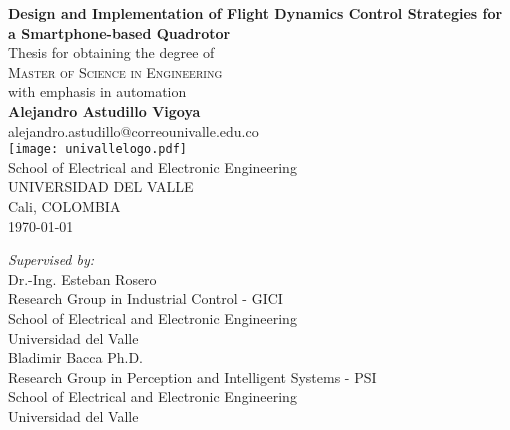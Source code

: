 \begin{titlepage}
\begin{center}
 {\LARGE\bfseries Design and Implementation of Flight Dynamics Control Strategies for a Smartphone-based Quadrotor\\}
 \vspace{2.5cm}
{Thesis for obtaining the degree of} \\[2cm]
\textsc{\Large{{Master of Science in Engineering}}} \\[5pt]
{with emphasis in automation} \\[2pt]
 \vfill
 \vspace{0.5cm}
 \vspace{1.5cm}
 {\Large\bfseries Alejandro Astudillo Vigoya}\\[5pt]
 alejandro.astudillo@correounivalle.edu.co\\[14pt]
 \vspace{1.5cm}
\texttt{[image: univallelogo.pdf]}\\[5pt]
{School of Electrical and Electronic Engineering}\\[5pt]
{UNIVERSIDAD DEL VALLE}\\[5pt]
{Cali, COLOMBIA}\\
 \vfill
 \vspace{0.3cm}
{\today} %
\end{center}
\end{titlepage}
\begin{titlepage}
\begin{minipage}{.95\linewidth}
\begin{flushleft}    
 \vspace{10.0cm}
 \textit{Supervised by:}\\
 \vspace{2.5cm}
	Dr.-Ing. Esteban Rosero\\ 
	Research Group in Industrial Control - GICI\\
	School of Electrical and Electronic Engineering\\
	Universidad del Valle\\
 \vspace{2.5cm}	
	Bladimir Bacca Ph.D.\\
	Research Group in Perception and Intelligent Systems - PSI\\
	School of Electrical and Electronic Engineering\\
	Universidad del Valle\\
\end{flushleft} 
\end{minipage}
\hfill
\end{titlepage}
